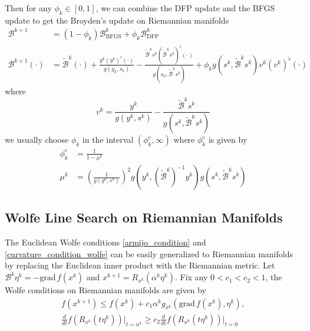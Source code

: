 \documentclass[12pt,a4paper,draft]{article}  %
\theoremstyle{definition}
\numberwithin{equation}{section}
\newcommand{\grad}{\mathrm{grad}\,}
\begin{document}
Then for any $\phi_k \in [0,1]$, we can combine the DFP update and the BFGS update to get the Broyden's update on Riemannian manifolds
\begin{equation}\label{Broyden_update_riemannian}
        \begin{aligned}
         \mathcal{B}^{k+1} &= (1-\phi_k)\mathcal{B}^k_{\mathrm{BFGS}} + \phi_k \mathcal{B}^k_{\mathrm{DFP}}\\
         \mathcal{B}^{k+1}(\cdot) &= \tilde{\mathcal{B}}^k(\cdot) + \frac{y^k (y^k)^\flat(\cdot)}{g(y_k,s_k)} - \frac{\tilde{\mathcal{B}}^k s^k (\tilde{\mathcal{B}}^ks^k)^\flat(\cdot)}{g(s_k, \tilde{\mathcal{B}}^k s^k)} + \phi_kg(s^k, \tilde{\mathcal{B}}^k s^k)v^k(v^k)^\flat(\cdot)
        \end{aligned}
\end{equation}
where
\[
v^k = \frac{y^k}{g(y^k,s^k)} - \frac{\tilde{\mathcal{B}}^k s^k}{g(s^k, \tilde{\mathcal{B}}^k s^k)}
\]
we usually choose $\phi_k$ in the interval $(\phi_k^c,\infty)$ where $\phi_k^c$ is given by
\begin{equation}
        \begin{aligned}
                \phi_k^c &= \frac{1}{1-\mu^k}\\
                \mu^k &= \left(\frac{1}{g(y^k,s^k)}\right)^2g(y^k, (\tilde{\mathcal{B}}^k)^{-1} y^k)g(s^k, \tilde{\mathcal{B}}^k s^k)
        \end{aligned}
\end{equation}
\subsection{Wolfe Line Search on Riemannian Manifolds}
The Euclidean Wolfe conditions \eqref{armijo_condition} and \eqref{curvature_condition_wolfe} can be easily generalized to Riemannian manifolds by replacing the Euclidean inner product with the Riemannian metric. Let $\mathcal{B}^k\eta^k = -\grad f(x^k)$ and $x^{k+1} = R_{x^k}(\alpha^k\eta^k)$. Fix any $0<c_1<c_2<1$, the Wolfe conditions on Riemannian manifolds are given by
\begin{align}
        f(x^{k+1}) \leq f(x^k) + c_1\alpha^k g_{x^k}(\grad f(x^k), \eta^k),\label{armijo_condition_riemannian}\\
        \frac{d}{dt}f\left(R_{x^k}(t\eta^k)\right)\Big|_{t=\alpha^k} \geq c_2\frac{d}{dt}f\left(R_{x^k}(t\eta^k)\right)\Big|_{t=0} \label{curvature_condition_wolfe_riemannian}
\end{align}
\end{document}
